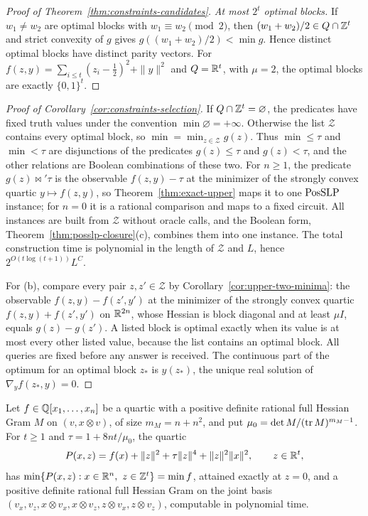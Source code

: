 \begin{proof}[Proof of Theorem~\ref{thm:constraints-candidates}]
\emph{At most $2^t$ optimal blocks.} If $w_1\ne w_2$ are optimal blocks with
$w_1\equiv w_2\pmod 2$, then $(w_1+w_2)/2\in Q\cap\mathbb Z^t$ and strict convexity
of $g$ gives $g((w_1+w_2)/2)<\min g$. Hence distinct optimal blocks have
distinct parity vectors. For $f(z,y)=\sum_{i\le t}(z_i-\frac12)^2+\|y\|^2$ and
$Q=\mathbb R^t$, with $\mu=2$, the optimal blocks are exactly $\{0,1\}^t$.
\end{proof}

\begin{proof}[Proof of Corollary~\ref{cor:constraints-selection}]
If $Q\cap\mathbb Z^t=\varnothing$, the predicates have fixed truth values under the
convention $\min\varnothing=+\infty$. Otherwise the list $\mathcal Z$ contains
every optimal block, so $\min=\min_{z\in\mathcal Z}g(z)$. Thus
$\min\le\tau$ and $\min<\tau$ are disjunctions of the predicates
$g(z)\le\tau$ and $g(z)<\tau$, and the other relations are Boolean
combinations of these two. For $n\ge1$, the predicate $g(z)\bowtie'\tau$ is the
observable $f(z,y)-\tau$ at the minimizer of the strongly convex quartic
$y\mapsto f(z,y)$, so Theorem~\ref{thm:exact-upper} maps it to one $\mathrm{PosSLP}$
instance; for $n=0$ it is a rational comparison and maps to a fixed circuit.
All instances are built from $\mathcal Z$ without oracle calls, and the
Boolean form, Theorem~\ref{thm:posslp-closure}(c), combines them into one
instance. The total construction time is polynomial in the length of
$\mathcal Z$ and $L$, hence $2^{O(t\log(t+1))}L^{C}$.

For (b), compare every pair $z,z'\in\mathcal Z$ by
Corollary~\ref{cor:upper-two-minima}: the observable $f(z,y)-f(z',y')$ at the
minimizer of the strongly convex quartic $f(z,y)+f(z',y')$ on $\mathbb R^{2n}$, whose
Hessian is block diagonal and at least $\mu I$, equals $g(z)-g(z')$. A listed block is optimal exactly when its value
is at most every other listed value, because the list contains an optimal
block. All queries are fixed before any answer is received. The continuous
part of the optimum for an optimal block $z_*$ is $y(z_*)$, the unique real
solution of $\nabla_yf(z_*,y)=0$.
\end{proof}

\begin{lemma}
\label{lem:constraints-padding}
Let $f\in\mathbb Q[x_1,\ldots,x_n]$ be a quartic with a positive definite rational
full Hessian Gram $M$ on $(v,x\otimes v)$, of size $m_M=n+n^2$, and put
$\mu_0=\det M/(\operatorname{tr} M)^{m_M-1}$. For $t\ge1$ and
$\tau=1+8nt/\mu_0$, the quartic
\[
 P(x,z)=f(x)+\|z\|^2+\tau\|z\|^4+\|z\|^2\|x\|^2,\qquad z\in\mathbb R^t,
\]
has $\min\{P(x,z):x\in\mathbb R^n,\ z\in\mathbb Z^t\}=\min f$, attained exactly at
$z=0$, and a positive definite rational full Hessian Gram on the joint basis
$(v_x,v_z,x\otimes v_x,x\otimes v_z,z\otimes v_x,z\otimes v_z)$, computable in
polynomial time.
\end{lemma}

